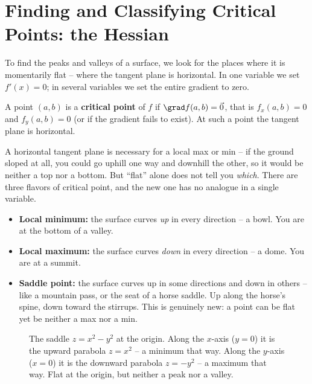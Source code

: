 \section{Finding and Classifying Critical Points: the Hessian}
\label{ch33:hessian}

To find the peaks and valleys of a surface, we look for the places where it is
momentarily flat -- where the tangent plane is horizontal. In one variable we set
$f'(x)=0$; in several variables we set the entire gradient to zero.

\begin{definition}
\label{ch33:def-critical}
A point $(a,b)$ is a \textbf{critical point} of $f$ if $\grad f(a,b)=\vec 0$, that
is $f_x(a,b)=0$ and $f_y(a,b)=0$ (or if the gradient fails to exist). At such a
point the tangent plane is horizontal.
\end{definition}

A horizontal tangent plane is necessary for a local max or min -- if the ground
sloped at all, you could go uphill one way and downhill the other, so it would be
neither a top nor a bottom. But ``flat'' alone does not tell you \emph{which}.
There are three flavors of critical point, and the new one has no analogue in a
single variable.

\begin{itemize}
\item \textbf{Local minimum:} the surface curves \emph{up} in every direction -- a
bowl. You are at the bottom of a valley.
\item \textbf{Local maximum:} the surface curves \emph{down} in every direction --
a dome. You are at a summit.
\item \textbf{Saddle point:} the surface curves up in some directions and down in
others -- like a mountain pass, or the seat of a horse saddle. Up along the horse's
spine, down toward the stirrups. This is genuinely new: a point can be flat yet be
neither a max nor a min.
\end{itemize}

\begin{figure}[H]
\centering
{}
\caption{The saddle $z=x^2-y^2$ at the origin. Along the $x$-axis ($y=0$) it is the
upward parabola $z=x^2$ -- a minimum that way. Along the $y$-axis ($x=0$) it is the
downward parabola $z=-y^2$ -- a maximum that way. Flat at the origin, but neither a
peak nor a valley.}
\label{ch33:fig-saddle}
\end{figure}


